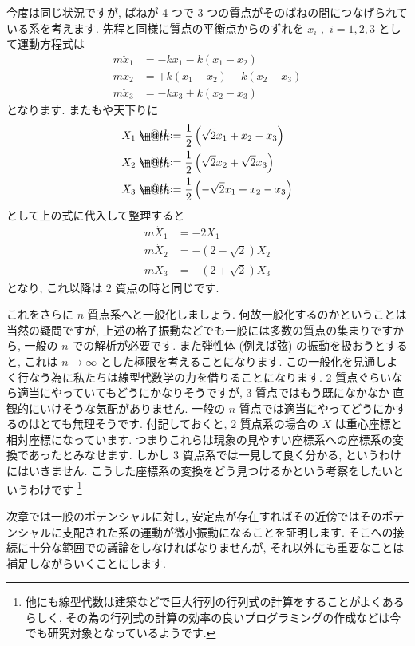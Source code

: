 \documentclass[openany, a4paper, oneside]{jsbook}
\makeatletter
\newcommand*{\defeq}{\mathrel{\rlap{%
\raisebox{0.3ex}{$\m@th\cdot$}}%
\raisebox{-0.3ex}{$\m@th\cdot$}}%
=}
\theoremstyle{break}
\theoremstyle{breakdefn}
\makeatother
\begin{document}
今度は同じ状況ですが, ばねが 4 つで 3 つの質点がそのばねの間につなげられている系を考えます.
先程と同様に質点の平衡点からのずれを $x_{i}\,\,,\,\,i=1,2,3$ として運動方程式は
\begin{align}
m\ddot{x}_{1} &= -kx_1 - k (x_1 - x_2 ) \\
m\ddot{x}_{2} &= + k (x_1 - x_2 ) - k (x_2 - x_3) \\
m\ddot{x}_{3} &= -kx_3 +k (x_2 - x_3 )
\end{align}
となります. またもや天下りに
\begin{align}
X_1 &\defeq \frac{1}{2} \left ( \sqrt{2}x_1 + x_2 - x_3 \right) \\
X_2 &\defeq \frac{1}{2} \left ( \sqrt{2}x_2 + \sqrt{2}x_3 \right) \\
X_3 &\defeq \frac{1}{2} \left ( -\sqrt{2}x_1 + x_2 - x_3 \right)
\end{align}
として上の式に代入して整理すると
\begin{align}
m\ddot{X}_1 &= -2X_1 \\
m\ddot{X}_2 &= -(2 - \sqrt{2}) X_2 \\
m\ddot{X}_3 &= -(2 + \sqrt{2}) X_3
\end{align}
となり, これ以降は 2 質点の時と同じです.

これをさらに $n$ 質点系へと一般化しましょう. 何故一般化するのかということは当然の疑問ですが,
上述の格子振動などでも一般には多数の質点の集まりですから, 一般の $n$ での解析が必要です.
また弾性体 (例えば弦) の振動を扱おうとすると, これは $n\rightarrow \infty$ とした極限を考えることになります.
この一般化を見通しよく行なう為に私たちは線型代数学の力を借りることになります.
2 質点ぐらいなら適当にやっていてもどうにかなりそうですが, 3 質点ではもう既になかなか
直観的にいけそうな気配がありません. 一般の $n$ 質点では適当にやってどうにかするのはとても無理そうです.
付記しておくと,  $2$ 質点系の場合の $X$ は重心座標と相対座標になっています.
つまりこれらは現象の見やすい座標系への座標系の変換であったとみなせます.
しかし $3$ 質点系では一見して良く分かる, というわけにはいきません.
こうした座標系の変換をどう見つけるかという考察をしたいというわけです \footnote{他にも線型代数は建築などで巨大行列の行列式の計算をすることがよくあるらしく,
その為の行列式の計算の効率の良いプログラミングの作成などは今でも研究対象となっているようです.
 }

次章では一般のポテンシャルに対し,
安定点が存在すればその近傍ではそのポテンシャルに支配された系の運動が微小振動になることを証明します.
そこへの接続に十分な範囲での議論をしなければなりませんが, それ以外にも重要なことは補足しながらいくことにします.
\end{document}
